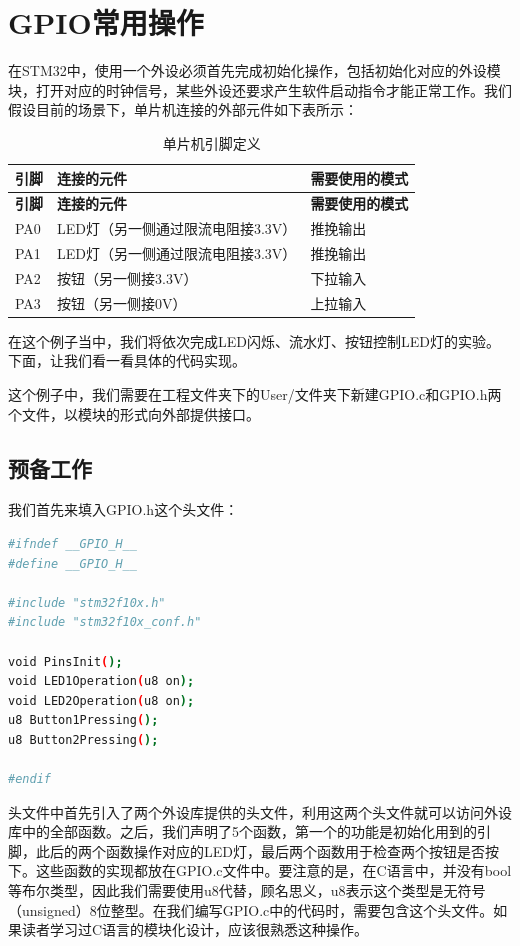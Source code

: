 \section{GPIO常用操作}
在STM32中，使用一个外设必须首先完成初始化操作，包括初始化对应的外设模块，打开对应的时钟信号，某些外设还要求产生软件启动指令才能正常工作。我们假设目前的场景下，单片机连接的外部元件如下表所示：
\begin{center}
	\begin{longtable}[l]{| p{20mm} | p{80mm} | p{40mm} |}
		\caption{单片机引脚定义}	\label{chart:exampal1}\\
		\hline 
		\rowcolor{Gray}
		\textbf{引脚} & \textbf{连接的元件} & \textbf{需要使用的模式} \\
		\hline
		\endfirsthead
		
		\hline 
		\rowcolor{Gray}
		\textbf{引脚} & \textbf{连接的元件} & \textbf{需要使用的模式} \\
		\hline
		\endhead
		
		PA0 & LED灯（另一侧通过限流电阻接3.3V）  & 推挽输出 \\
		PA1 & LED灯（另一侧通过限流电阻接3.3V）  & 推挽输出 \\
		PA2 & 按钮（另一侧接3.3V） & 下拉输入 \\
		PA3 & 按钮（另一侧接0V） & 上拉输入\\
		
		\hline
	\end{longtable}
\end{center}
\par 
在这个例子当中，我们将依次完成LED闪烁、流水灯、按钮控制LED灯的实验。下面，让我们看一看具体的代码实现。
\par 
这个例子中，我们需要在工程文件夹下的User/文件夹下新建GPIO.c和GPIO.h两个文件，以模块的形式向外部提供接口。

	\subsection{预备工作}
	我们首先来填入GPIO.h这个头文件：
	\par 
	\begin{lstlisting}[language=bash, style=customStyleC, caption=GPIO.h]
#ifndef __GPIO_H__
#define __GPIO_H__

#include "stm32f10x.h" 
#include "stm32f10x_conf.h" 

void PinsInit();
void LED1Operation(u8 on);
void LED2Operation(u8 on);
u8 Button1Pressing();
u8 Button2Pressing();

#endif
	\end{lstlisting}
	\par 
	头文件中首先引入了两个外设库提供的头文件，利用这两个头文件就可以访问外设库中的全部函数。之后，我们声明了5个函数，第一个的功能是初始化用到的引脚，此后的两个函数操作对应的LED灯，最后两个函数用于检查两个按钮是否按下。这些函数的实现都放在GPIO.c文件中。要注意的是，在C语言中，并没有bool等布尔类型，因此我们需要使用u8代替，顾名思义，u8表示这个类型是无符号（unsigned）8位整型。在我们编写GPIO.c中的代码时，需要包含这个头文件。如果读者学习过C语言的模块化设计，应该很熟悉这种操作。
